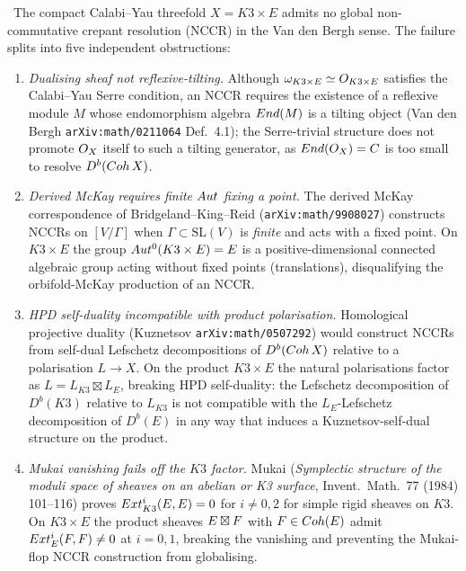 \begin{proposition}
\label{prop:k3e-five-obstructions}
\ClaimStatusProposition\
The compact Calabi--Yau threefold $X = K3 \times E$ admits no global
non-commutative crepant resolution (NCCR) in the Van den Bergh sense.
The failure splits into five independent obstructions:

\begin{enumerate}[label=\emph{(\alph*)}, leftmargin=2.5em]
\item \emph{Dualising sheaf not reflexive-tilting.} Although
$\omega_{K3 \times E} \simeq O_{K3 \times E}$ satisfies the
Calabi--Yau Serre condition, an NCCR requires the existence of a
reflexive module $M$ whose endomorphism algebra $End(M)$ is a tilting
object (Van den Bergh \texttt{arXiv:math/0211064} Def.~4.1); the
Serre-trivial structure does not promote $O_X$ itself to such a
tilting generator, as $End(O_X) = C$ is too small to resolve
$D^b(Coh\,X)$.

\item \emph{Derived McKay requires finite $Aut$ fixing a point.}
The derived McKay correspondence of Bridgeland--King--Reid
(\texttt{arXiv:math/9908027}) constructs NCCRs on $[V/\Gamma]$ when
$\Gamma \subset \mathrm{SL}(V)$ is \emph{finite} and acts with a fixed
point. On $K3\times E$ the group $Aut^0(K3\times E) = E$ is a
positive-dimensional connected algebraic group acting without fixed
points (translations), disqualifying the orbifold-McKay production of
an NCCR.

\item \emph{HPD self-duality incompatible with product polarisation.}
Homological projective duality (Kuznetsov \texttt{arXiv:math/0507292})
would construct NCCRs from self-dual Lefschetz decompositions of
$D^b(Coh\,X)$ relative to a polarisation $L \to X$. On the product
$K3 \times E$ the natural polarisations factor as
$L = L_{K3} \boxtimes L_E$, breaking HPD self-duality: the Lefschetz
decomposition of $D^b(K3)$ relative to $L_{K3}$ is not compatible with
the $L_E$-Lefschetz decomposition of $D^b(E)$ in any way that induces
a Kuznetsov-self-dual structure on the product.

\item \emph{Mukai vanishing fails off the $K3$ factor.} Mukai
(\emph{Symplectic structure of the moduli space of sheaves on an
abelian or K3 surface}, Invent.\ Math.\ 77 (1984) 101--116) proves
$Ext^i_{K3}(E, E) = 0$ for $i \neq 0, 2$ for simple rigid sheaves
on $K3$. On $K3 \times E$ the product sheaves $E \boxtimes F$ with
$F \in Coh(E)$ admit $Ext^i_{E}(F, F) \neq 0$ at $i = 0, 1$,
breaking the vanishing and preventing the Mukai-flop NCCR construction
from globalising.


\end{enumerate}
\end{proposition}
